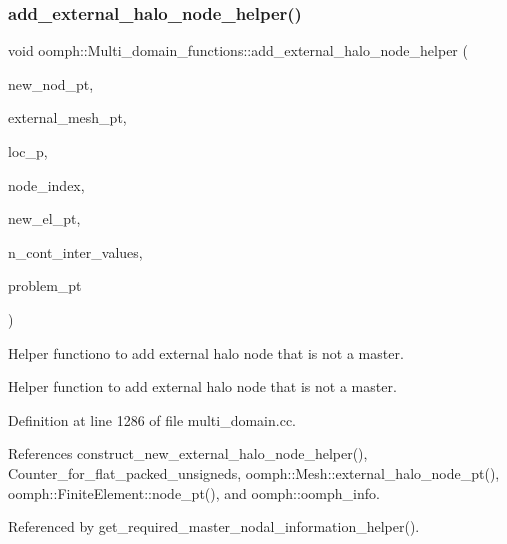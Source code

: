 \subsubsection{\texorpdfstring{add\+\_\+external\+\_\+halo\+\_\+node\+\_\+helper()}{add\_external\_halo\_node\_helper()}}
{\footnotesize\ttfamily void oomph\+::\+Multi\+\_\+domain\+\_\+functions\+::add\+\_\+external\+\_\+halo\+\_\+node\+\_\+helper (\begin{DoxyParamCaption}\item[{\hyperlink{classoomph_1_1Node}{Node} $\ast$\&}]{new\+\_\+nod\+\_\+pt,  }\item[{\hyperlink{classoomph_1_1Mesh}{Mesh} $\ast$const \&}]{external\+\_\+mesh\+\_\+pt,  }\item[{unsigned \&}]{loc\+\_\+p,  }\item[{unsigned \&}]{node\+\_\+index,  }\item[{\hyperlink{classoomph_1_1FiniteElement}{Finite\+Element} $\ast$const \&}]{new\+\_\+el\+\_\+pt,  }\item[{int \&}]{n\+\_\+cont\+\_\+inter\+\_\+values,  }\item[{\hyperlink{classoomph_1_1Problem}{Problem} $\ast$}]{problem\+\_\+pt }\end{DoxyParamCaption})}



Helper functiono to add external halo node that is not a master. 

Helper function to add external halo node that is not a master. 

Definition at line 1286 of file multi\+\_\+domain.\+cc.



References construct\+\_\+new\+\_\+external\+\_\+halo\+\_\+node\+\_\+helper(), Counter\+\_\+for\+\_\+flat\+\_\+packed\+\_\+unsigneds, oomph\+::\+Mesh\+::external\+\_\+halo\+\_\+node\+\_\+pt(), oomph\+::\+Finite\+Element\+::node\+\_\+pt(), and oomph\+::oomph\+\_\+info.



Referenced by get\+\_\+required\+\_\+master\+\_\+nodal\+\_\+information\+\_\+helper().

\mbox{\label{namespaceoomph_1_1Multi__domain__functions_a6415c5c0119c75e162418a0c9b59b4f7}} 
